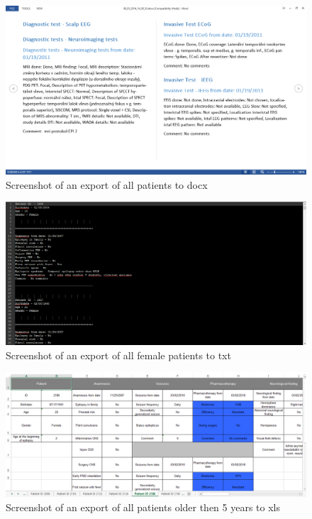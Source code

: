 \documentclass[thesis=B,english]{FITthesis}[2012/10/20]
\begin{document}
\begin{figure}
	\centering
 	\includegraphics[width=1\textwidth]{images/docxExport_2.png}
 	\caption{Screenshot of an export of all patients to docx}
 	\label{fig:docxExport_2}
\end{figure}

\begin{figure}
	\centering
 	\includegraphics[width=1\textwidth]{images/txtExport.png}
 	\caption{Screenshot of an export of all female patients to txt}
 	\label{fig:txtExport}
\end{figure}

\begin{figure}
	\centering
 	\includegraphics[width=1\textwidth]{images/xlsExport_1.png}
 	\caption{Screenshot of an export of all patients older then 5 years to xls}
 	\label{fig:xlsExport_1}
\end{figure}
\end{document}
